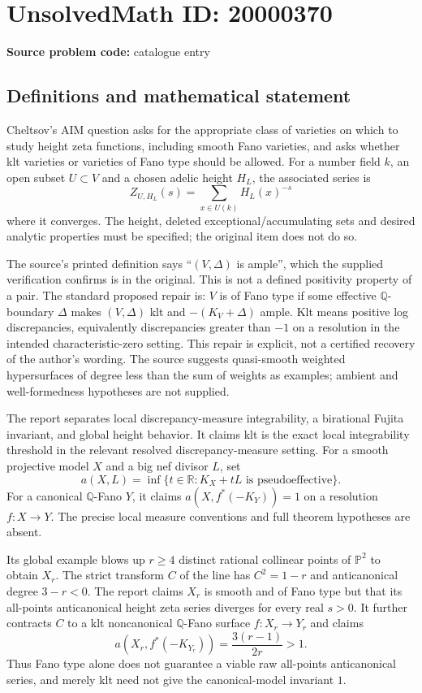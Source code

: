 \documentclass[11pt]{article}
\newcommand{\Q}{\mathbb{Q}}
\newcommand{\R}{\mathbb{R}}
\newcommand{\PP}{\mathbb{P}}
\begin{document}
\section*{UnsolvedMath ID: 20000370}
\textbf{Source problem code:} catalogue entry
\subsection{Definitions and mathematical statement}
Cheltsov's AIM question asks for the appropriate class of varieties on which to study height zeta functions, including smooth Fano varieties, and asks whether klt varieties or varieties of Fano type should be allowed. For a number field $k$, an open subset $U\subset V$ and a chosen adelic height $H_L$, the associated series is
\[
 Z_{U,H_L}(s)=\sum_{x\in U(k)}H_L(x)^{-s}
\]
where it converges. The height, deleted exceptional/accumulating sets and desired analytic properties must be specified; the original item does not do so.

The source's printed definition says ``$(V,\Delta)$ is ample'', which the supplied verification confirms is in the original. This is not a defined positivity property of a pair. The standard proposed repair is: $V$ is of Fano type if some effective $\Q$-boundary $\Delta$ makes $(V,\Delta)$ klt and $-(K_V+\Delta)$ ample. Klt means positive log discrepancies, equivalently discrepancies greater than $-1$ on a resolution in the intended characteristic-zero setting. This repair is explicit, not a certified recovery of the author's wording. The source suggests quasi-smooth weighted hypersurfaces of degree less than the sum of weights as examples; ambient and well-formedness hypotheses are not supplied.

The report separates local discrepancy-measure integrability, a birational Fujita invariant, and global height behavior. It claims klt is the exact local integrability threshold in the relevant resolved discrepancy-measure setting. For a smooth projective model $X$ and a big nef divisor $L$, set
\[
 a(X,L)=\inf\{t\in\R:K_X+tL\text{ is pseudoeffective}\}.
\]
For a canonical $\Q$-Fano $Y$, it claims $a(X,f^*(-K_Y))=1$ on a resolution $f:X\to Y$. The precise local measure conventions and full theorem hypotheses are absent.

Its global example blows up $r\geq4$ distinct rational collinear points of $\PP^2$ to obtain $X_r$. The strict transform $C$ of the line has $C^2=1-r$ and anticanonical degree $3-r<0$. The report claims $X_r$ is smooth and of Fano type but that its all-points anticanonical height zeta series diverges for every real $s>0$. It further contracts $C$ to a klt noncanonical $\Q$-Fano surface $f:X_r\to Y_r$ and claims
\[
 a(X_r,f^*(-K_{Y_r}))=\frac{3(r-1)}{2r}>1.
\]
Thus Fano type alone does not guarantee a viable raw all-points anticanonical series, and merely klt need not give the canonical-model invariant $1$.
\end{document}
